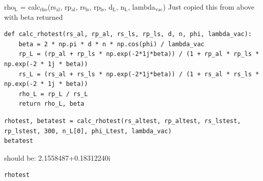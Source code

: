 \documentclass[11pt]{article}
\begin{document}
rho\(_{\text{L}}\) = calc\(_{\text{rho}}\)(rs\(_{\text{al}}\), rp\(_{\text{al}}\), rs\(_{\text{ls}}\), rp\(_{\text{ls}}\), d\(_{\text{L}}\), n\(_{\text{L}}\), lambda\(_{\text{vac}}\))
 Just copied this from above with beta returned 
\begin{verbatim}
def calc_rhotest(rs_al, rp_al, rs_ls, rp_ls, d, n, phi, lambda_vac):
    beta = 2 * np.pi * d * n * np.cos(phi) / lambda_vac
    rp_L = (rp_al + rp_ls * np.exp(-2*1j*beta)) / (1 + rp_al * rp_ls * np.exp(-2 * 1j * beta))
    rs_L = (rs_al + rs_ls * np.exp(-2*1j*beta)) / (1 + rs_al * rs_ls * np.exp(-2 * 1j * beta))
    rho_L = rp_L / rs_L
    return rho_L, beta
\end{verbatim}

\begin{verbatim}
rhotest, betatest = calc_rhotest(rs_altest, rp_altest, rs_lstest, rp_lstest, 300, n_L[0], phi_Ltest, lambda_vac)
betatest
\end{verbatim}
should be: 2.1558487+0.18312240i

\begin{verbatim}
rhotest 
\end{verbatim}

\section{}
\label{sec:org35c7c1f}
\end{document}
